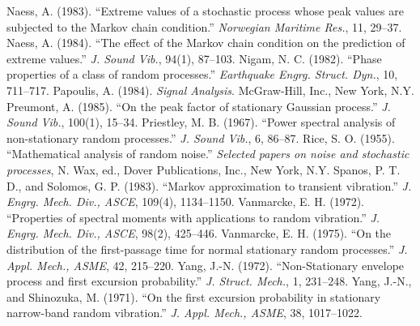 \documentclass[12pt]{article}
\begin{document}
\begin{thebibliography}{99}
 Naess, A. (1983). ``Extreme values of a stochastic process whose peak values are subjected to the Markov chain condition.'' \emph{Norwegian Maritime Res.}, 11, 29--37.
 Naess, A. (1984). ``The effect of the Markov chain condition on the prediction of extreme values.'' \emph{J. Sound Vib.}, 94(1), 87--103.
 Nigam, N. C. (1982). ``Phase properties of a class of random processes.'' \emph{Earthquake Engrg. Struct. Dyn.}, 10, 711--717.
 Papoulis, A. (1984). \emph{Signal Analysis}. McGraw-Hill, Inc., New York, N.Y.
 Preumont, A. (1985). ``On the peak factor of stationary Gaussian process.'' \emph{J. Sound Vib.}, 100(1), 15--34.
 Priestley, M. B. (1967). ``Power spectral analysis of non-stationary random processes.'' \emph{J. Sound Vib.}, 6, 86--87.
 Rice, S. O. (1955). ``Mathematical analysis of random noise.'' \emph{Selected papers on noise and stochastic processes}, N. Wax, ed., Dover Publications, Inc., New York, N.Y.
 Spanos, P. T. D., and Solomos, G. P. (1983). ``Markov approximation to transient vibration.'' \emph{J. Engrg. Mech. Div., ASCE}, 109(4), 1134--1150.
 Vanmarcke, E. H. (1972). ``Properties of spectral moments with applications to random vibration.'' \emph{J. Engrg. Mech. Div., ASCE}, 98(2), 425--446.
 Vanmarcke, E. H. (1975). ``On the distribution of the first-passage time for normal stationary random processes.'' \emph{J. Appl. Mech., ASME}, 42, 215--220.
 Yang, J.-N. (1972). ``Non-Stationary envelope process and first excursion probability.'' \emph{J. Struct. Mech.}, 1, 231--248.
 Yang, J.-N., and Shinozuka, M. (1971). ``On the first excursion probability in stationary narrow-band random vibration.'' \emph{J. Appl. Mech., ASME}, 38, 1017--1022.
\end{thebibliography}
\end{document}
